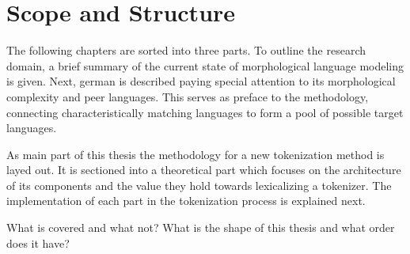 \section{Scope and Structure}
\label{sec:scope-and-structure}

The following chapters are sorted into three parts.
To outline the research domain, a brief summary of the current state of morphological language modeling is given.
Next, german is described paying special attention to its morphological complexity and peer languages.
This serves as preface to the methodology, connecting characteristically matching languages to form a pool of possible  target languages.

As main part of this thesis the methodology for a new tokenization method is layed out.
It is sectioned into a theoretical part which focuses on the architecture of its components and the value they hold towards lexicalizing a tokenizer.
The implementation of each part in the tokenization process is explained next.

What is covered and what not?
What is the shape of this thesis and what order does it have?
